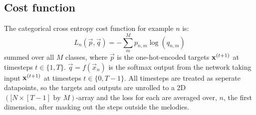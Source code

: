 	\subsection{Cost function} 
	The categorical cross entropy cost function for example $n$ is:
	\begin{equation}
		L_n(\vec{p}, \vec{q}) = -\sum^{M}_{m} p_{n,m} \log (q_{n,m})
	\end{equation}
	summed over all $M$ classes, where $\vec{p}$ is the one-hot-encoded targets $\bm{\mathrm{x}}^{(t+1)}$ at timesteps $t\in\{1, T\}$. $\vec{q}=f(\vec{x}_n)$ is the softmax output from the network taking input $\bm{\mathrm{x}}^{(t+1)}$ at timesteps $t\in\{0, T-1\}$. All timesteps are treated as seperate datapoints, so the targets and outputs are unrolled to a 2D $([N \times [T-1] \text{ by } M)$-array and the loss for each are averaged over, $n$, the first dimension, after masking out the steps outside the melodies.







